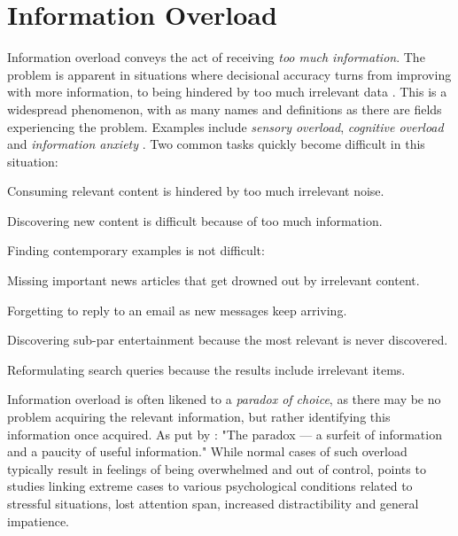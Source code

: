 \section{Information Overload}

Information overload conveys the act of receiving \emph{too much information}. 
The problem is apparent in situations where decisional accuracy turns from improving with more information, 
to being hindered by too much irrelevant data \cite[p13]{Bjorkoy2010d}. 
This is a widespread phenomenon, with as many names and definitions as there are fields experiencing the problem. 
Examples include \emph{sensory overload}, \emph{cognitive overload} and \emph{information anxiety} \cite[p2]{Eppler2004}.
Two common tasks quickly become difficult in this situation:

\begin{enumerate*}
  \item Consuming relevant content is hindered by too much irrelevant noise.
  \item Discovering new content is difficult because of too much information.
\end{enumerate*}

\noindent
Finding contemporary examples is not difficult:

\begin{itemize*}
  \item Missing important news articles that get drowned out by irrelevant content.
  \item Forgetting to reply to an email as new messages keep arriving.
  \item Discovering sub-par entertainment because the most relevant is never discovered.
  \item Reformulating search queries because the results include irrelevant items.
\end{itemize*}

Information overload is often likened to a \emph{paradox of choice}, as there may be no problem acquiring the relevant information, 
but rather identifying this information once acquired. As put by \cite[p6]{Edmunds2000}: 
"The paradox --- a surfeit of information and a paucity of useful information."
While normal cases of such overload typically result in feelings of being overwhelmed and out of control, 
\citet[p5]{Bawden2008} points to studies linking extreme cases to various psychological conditions 
related to stressful situations, lost attention span, increased distractibility and general impatience.

